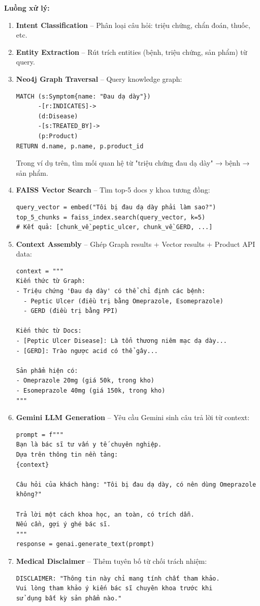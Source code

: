 \documentclass[12pt,a4paper]{article}
\begin{document}
\textbf{Luồng xử lý:}

\begin{enumerate}
    \item \textbf{Intent Classification} – Phân loại câu hỏi: triệu chứng, chẩn đoán, thuốc, etc.
    
    \item \textbf{Entity Extraction} – Rút trích entities (bệnh, triệu chứng, sản phẩm) từ query.
    
    \item \textbf{Neo4j Graph Traversal} – Query knowledge graph:
    \begin{verbatim}
MATCH (s:Symptom{name: "Đau dạ dày"})
      -[r:INDICATES]->
      (d:Disease)
      -[s:TREATED_BY]->
      (p:Product)
RETURN d.name, p.name, p.product_id
    \end{verbatim}
    Trong ví dụ trên, tìm mối quan hệ từ "triệu chứng đau dạ dày" → bệnh → sản phẩm.
    
    \item \textbf{FAISS Vector Search} – Tìm top-5 docs y khoa tương đồng:
    \begin{verbatim}
query_vector = embed("Tôi bị đau dạ dày phải làm sao?")
top_5_chunks = faiss_index.search(query_vector, k=5)
# Kết quả: [chunk_về_peptic_ulcer, chunk_về_GERD, ...]
    \end{verbatim}
    
    \item \textbf{Context Assembly} – Ghép Graph results + Vector results + Product API data:
    \begin{verbatim}
context = """
Kiến thức từ Graph:
- Triệu chứng 'Đau dạ dày' có thể chỉ định các bệnh:
  - Peptic Ulcer (điều trị bằng Omeprazole, Esomeprazole)
  - GERD (điều trị bằng PPI)

Kiến thức từ Docs:
- [Peptic Ulcer Disease]: Là tổn thương niêm mạc dạ dày...
- [GERD]: Trào ngược acid có thể gây...

Sản phẩm hiện có:
- Omeprazole 20mg (giá 50k, trong kho)
- Esomeprazole 40mg (giá 150k, trong kho)
"""
    \end{verbatim}
    
    \item \textbf{Gemini LLM Generation} – Yêu cầu Gemini sinh câu trả lời từ context:
    \begin{verbatim}
prompt = f"""
Bạn là bác sĩ tư vấn y tế chuyên nghiệp.
Dựa trên thông tin nền tảng:
{context}

Câu hỏi của khách hàng: "Tôi bị đau dạ dày, có nên dùng Omeprazole không?"

Trả lời một cách khoa học, an toàn, có trích dẫn.
Nếu cần, gợi ý ghé bác sĩ.
"""
response = genai.generate_text(prompt)
    \end{verbatim}
    
    \item \textbf{Medical Disclaimer} – Thêm tuyên bố từ chối trách nhiệm:
    \begin{verbatim}
DISCLAIMER: "Thông tin này chỉ mang tính chất tham khảo. 
Vui lòng tham khảo ý kiến bác sĩ chuyên khoa trước khi 
sử dụng bất kỳ sản phẩm nào."
    \end{verbatim}
\end{enumerate}
\end{document}
